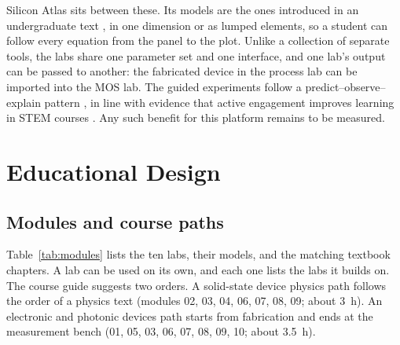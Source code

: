 \documentclass[conference]{IEEEtran}
\begin{document}
Silicon Atlas sits between these. Its models are the ones introduced in an undergraduate text \cite{neamen2012}, in one dimension or as lumped elements, so a student can follow every equation from the panel to the plot. Unlike a collection of separate tools, the labs share one parameter set and one interface, and one lab's output can be passed to another: the fabricated device in the process lab can be imported into the MOS lab. The guided experiments follow a predict--observe--explain pattern \cite{white1992}, in line with evidence that active engagement improves learning in STEM courses \cite{freeman2014}. Any such benefit for this platform remains to be measured.

\section{Educational Design}\label{sec:design}
\subsection{Modules and course paths}
Table~\ref{tab:modules} lists the ten labs, their models, and the matching textbook chapters. A lab can be used on its own, and each one lists the labs it builds on. The course guide suggests two orders. A solid-state device physics path follows the order of a physics text (modules 02, 03, 04, 06, 07, 08, 09; about 3~h). An electronic and photonic devices path starts from fabrication and ends at the measurement bench (01, 05, 03, 06, 07, 08, 09, 10; about 3.5~h).
\end{document}
